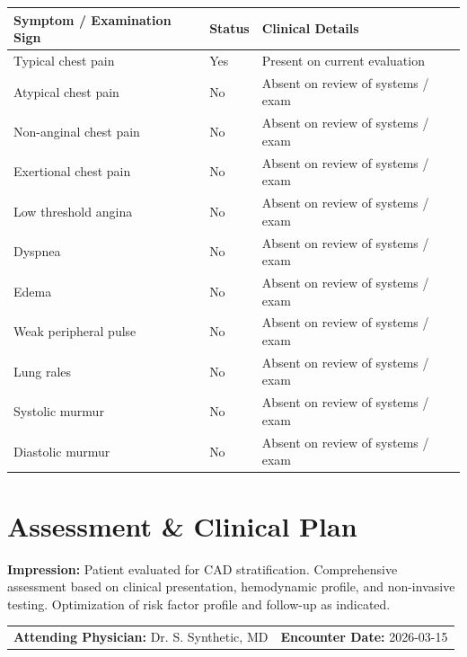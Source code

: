 \documentclass[10pt,a4paper]{article}
\begin{document}
\begin{tabular}{@{} p{6.8cm} p{2.8cm} p{5.5cm} @{}}
  \toprule
  \textbf{Symptom / Examination Sign} & \textbf{Status} & \textbf{Clinical Details} \\
  \midrule
  Typical chest pain & Yes & Present on current evaluation \\
  Atypical chest pain & No & Absent on review of systems / exam \\
  Non-anginal chest pain & No & Absent on review of systems / exam \\
  Exertional chest pain & No & Absent on review of systems / exam \\
  Low threshold angina & No & Absent on review of systems / exam \\
  Dyspnea & No & Absent on review of systems / exam \\
  Edema & No & Absent on review of systems / exam \\
  Weak peripheral pulse & No & Absent on review of systems / exam \\
  Lung rales & No & Absent on review of systems / exam \\
  Systolic murmur & No & Absent on review of systems / exam \\
  Diastolic murmur & No & Absent on review of systems / exam \\
  \bottomrule
\end{tabular}

\vspace{8pt}

\section*{Assessment \& Clinical Plan}

\noindent
\textbf{Impression:} Patient evaluated for CAD stratification. Comprehensive assessment based on clinical presentation, hemodynamic profile, and non-invasive testing. Optimization of risk factor profile and follow-up as indicated.

\vspace{14pt}

\noindent
\begin{tabular*}{\textwidth}{@{} l @{\extracolsep{\fill}} r @{}}
  \textbf{Attending Physician:} Dr. S. Synthetic, MD & \textbf{Encounter Date:} 2026-03-15 \\
\end{tabular*}
\end{document}
